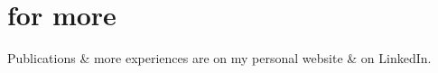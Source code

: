 \documentclass[]{friggeri-cv}
\begin{document}
\section{for more}
Publications \& more experiences are on my personal website \& on LinkedIn.



\end{document}

